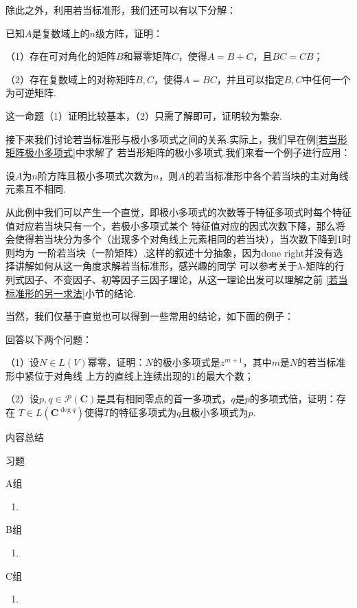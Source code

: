 除此之外，利用若当标准形，我们还可以有以下分解：
\begin{example}
	已知$A$是复数域上的$n$级方阵，证明：

	\textup{（1）}存在可对角化的矩阵$B$和幂零矩阵$C$，使得$A=B+C$，且$BC=CB$；

	\textup{（2）}存在复数域上的对称矩阵$B,C$，使得$A=BC$，并且可以指定$B,C$中任何一个为可逆矩阵.
\end{example}
这一命题（1）证明比较基本，（2）只需了解即可，证明较为繁杂.

接下来我们讨论若当标准形与极小多项式之间的关系.实际上，我们早在例\ref{若当形矩阵极小多项式}中求解了
若当形矩阵的极小多项式.我们来看一个例子进行应用：
\begin{example}
	设$A$为$n$阶方阵且极小多项式次数为$n$，则$A$的若当标准形中各个若当块的主对角线元素互不相同.
\end{example}
从此例中我们可以产生一个直觉，即极小多项式的次数等于特征多项式时每个特征值对应若当块只有一个，若极小多项式某个
特征值对应的因式次数下降，那么将会使得若当块分为多个（出现多个对角线上元素相同的若当块），当次数下降到1时则均为
一阶若当块（一阶矩阵）.这样的叙述十分抽象，因为done right并没有选择讲解如何从这一角度求解若当标准形，感兴趣的同学
可以参考关于$\lambda$-矩阵的行列式因子、不变因子、初等因子三因子理论，从这一理论出发可以理解之前
\ref{若当标准形的另一求法}小节的结论.

当然，我们仅基于直觉也可以得到一些常用的结论，如下面的例子：
\begin{example}
	回答以下两个问题：

	\textup{（1）}设$N\in L(V)$幂零，证明：$N$的极小多项式是$z^{m+1}$，其中$m$是$N$的若当标准形中紧位于对角线
	上方的直线上连续出现的$1$的最大个数；

	\textup{（2）}设$p,q\in\mathcal{P}(\mathbf{C})$是具有相同零点的首一多项式，$q$是$p$的多项式倍，证明：存在
	$T\in L(\mathbf{C}^{\deg q})$使得$T$的特征多项式为$q$且极小多项式为$p$.
\end{example}

\vspace{2ex} 
\centerline{\heiti \Large 内容总结}

\vspace{2ex} 

\centerline{\heiti \Large 习题}
\vspace{2ex} 
{\kaishu }
\begin{flushright}
    \kaishu

\end{flushright}
\centerline{\heiti A组}
\begin{enumerate}
	\item 
\end{enumerate}
\centerline{\heiti B组}
\begin{enumerate}
	\item 
\end{enumerate}
\centerline{\heiti C组}
\begin{enumerate}
	\item 
\end{enumerate}